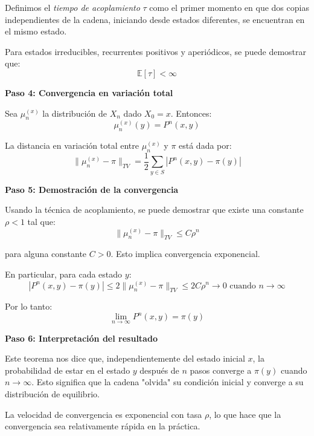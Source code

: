 \documentclass[12pt,a4paper]{article}
\begin{document}
Definimos el \emph{tiempo de acoplamiento} $\tau$ como el primer momento en que dos copias independientes de la cadena, iniciando desde estados diferentes, se encuentran en el mismo estado.

Para estados irreducibles, recurrentes positivos y aperiódicos, se puede demostrar que:
\begin{equation*}
\mathbb{E}[\tau] < \infty
\end{equation*}

\textbf{Paso 4: Convergencia en variación total}

Sea $\mu_n^{(x)}$ la distribución de $X_n$ dado $X_0 = x$. Entonces:
\begin{equation*}
\mu_n^{(x)}(y) = P^n(x,y)
\end{equation*}

La distancia en variación total entre $\mu_n^{(x)}$ y $\pi$ está dada por:
\begin{equation*}
\|\mu_n^{(x)} - \pi\|_{TV} = \frac{1}{2}\sum_{y \in S} |P^n(x,y) - \pi(y)|
\end{equation*}

\textbf{Paso 5: Demostración de la convergencia}

Usando la técnica de acoplamiento, se puede demostrar que existe una constante $\rho < 1$ tal que:
\begin{equation*}
\|\mu_n^{(x)} - \pi\|_{TV} \leq C \rho^n
\end{equation*}

para alguna constante $C > 0$. Esto implica convergencia exponencial.

En particular, para cada estado $y$:
\begin{equation*}
|P^n(x,y) - \pi(y)| \leq 2\|\mu_n^{(x)} - \pi\|_{TV} \leq 2C \rho^n \to 0 \text{ cuando } n \to \infty
\end{equation*}

Por lo tanto:
\begin{equation*}
\lim_{n \to \infty} P^n(x,y) = \pi(y)
\end{equation*}

\textbf{Paso 6: Interpretación del resultado}

Este teorema nos dice que, independientemente del estado inicial $x$, la probabilidad de estar en el estado $y$ después de $n$ pasos converge a $\pi(y)$ cuando $n \to \infty$. Esto significa que la cadena "olvida" su condición inicial y converge a su distribución de equilibrio.

La velocidad de convergencia es exponencial con tasa $\rho$, lo que hace que la convergencia sea relativamente rápida en la práctica.
\end{document}
